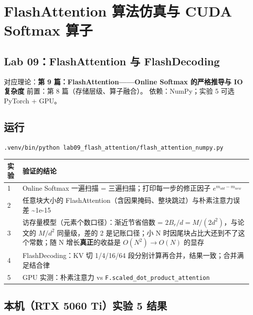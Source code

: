 \chapter{FlashAttention 算法仿真与 CUDA Softmax 算子}

\section{Lab 09：FlashAttention 与 FlashDecoding}

\begin{mathBox}[核心数学定理推导]
对应理论：\textbf{第 9 篇：FlashAttention——Online Softmax 的严格推导与 IO 复杂度}
前置：第 8 篇（存储层级、算子融合）。
依赖：NumPy；实验 5 可选 PyTorch + GPU。
\end{mathBox}

\section{运行}

\begin{lstlisting}[language=bash]
.venv/bin/python lab09_flash_attention/flash_attention_numpy.py
\end{lstlisting}

\begin{center}
\small
\begin{tabularx}{\textwidth}{p{3.5cm} X}
\toprule
\textbf{实验} & \textbf{验证的结论} \\
\midrule
1 & Online Softmax 一遍扫描 = 三遍扫描；打印每一步的修正因子 $e^{m_{old}-m_{new}}$ \\
2 & 任意块大小的 FlashAttention（含因果掩码、整块跳过）与朴素注意力误差 \textasciitilde{}1e-15 \\
3 & 访存量模型（元素个数口径）：渐近节省倍数 = $2B_r/d = M/(2d^2)$，与论文的 $M/d^2$ 同量级，差的 2 是记账口径；小 N 时因尾块占比大还到不了这个常数；随 N 增长\textbf{真正}的收益是 $O(N^2) \to O(N)$ 的显存 \\
4 & FlashDecoding：KV 切 1/4/16/64 段分别计算再合并，结果一致；合并满足结合律 \\
5 & GPU 实测：朴素注意力 vs \texttt{F.scaled\_dot\_product\_attention} \\
\bottomrule
\end{tabularx}
\end{center}

\section{本机（RTX 5060 Ti）实验 5 结果}


